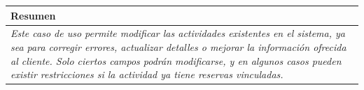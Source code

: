     \begin{table}[H]
        \begin{tabular}{llllllll}
        \hline
        \multicolumn{8}{|l|}{\cellcolor[HTML]{F2F2F2}Resumen}                                                                                                                                                                                                                                                                                                                                                                                             \\ \hline
        \multicolumn{8}{|p{15cm}|}{{\color[HTML]{808080} \textit{Este caso de uso permite modificar las actividades existentes en el sistema, ya sea para corregir errores, actualizar detalles o mejorar la información ofrecida al cliente. Solo ciertos campos podrán modificarse, y en algunos casos pueden existir restricciones si la actividad ya tiene reservas vinculadas.}}} \\ \hline
        \end{tabular}
    \end{table}

